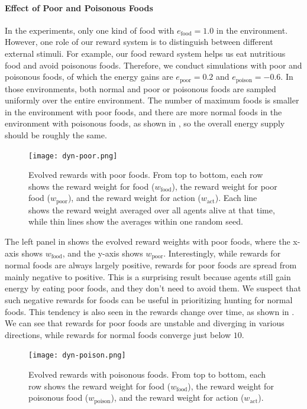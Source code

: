 \paragraph{Effect of Poor and Poisonous Foods}
In the experiments, only one kind of food with $e_{\mathrm{food}} = 1.0$ in the environment. However, one role of our reward system is to distinguish between different external stimuli. For example, our food reward system helps us eat nutritious food and avoid poisonous foods. Therefore, we conduct simulations with poor and poisonous foods, of which the energy gains are $e_{\mathrm{poor}} = 0.2$ and $e_{\mathrm{poison}} = -0.6$. In those environments, both normal and poor or poisonous foods are sampled uniformly over the entire environment. The number of maximum foods is smaller in the environment with poor foods, and there are more normal foods in the environment with poisonous foods, as shown in , so the overall energy supply should be roughly the same.

\begin{figure}[t]
  \centering
  \texttt{[image: dyn-poor.png]}
  \caption{
    Evolved rewards with poor foods.
    From top to bottom, each row shows the reward weight for food ($w_{\mathrm{food}}$), the reward weight for poor food ($w_{\mathrm{poor}}$), and the reward weight for action ($w_{\mathrm{act}}$).
    Each line shows the reward weight averaged over all agents alive at that time, while thin lines show the averages within one random seed.
  }\label{figure:result-dyn-poor}
\end{figure}

The left panel in  shows the evolved reward weights with poor foods, where the x-axis shows $w_{\mathrm{food}}$, and the y-axis shows $w_{\mathrm{poor}}$. Interestingly, while rewards for normal foods are always largely positive, rewards for poor foods are spread from mainly negative to positive. This is a surprising result because agents still gain energy by eating poor foods, and they don't need to avoid them. We suspect that such negative rewards for foods can be useful in prioritizing hunting for normal foods. This tendency is also seen in the rewards change over time, as shown in . We can see that rewards for poor foods are unstable and diverging in various directions, while rewards for normal foods converge just below $10$.

\begin{figure}[t]
  \centering
  \texttt{[image: dyn-poison.png]}
  \caption{
    Evolved rewards with poisonous foods.
    From top to bottom, each row shows the reward weight for food ($w_{\mathrm{food}}$), the reward weight for poisonous food ($w_{\mathrm{poison}}$), and the reward weight for action ($w_{\mathrm{act}}$).
  }\label{figure:result-dyn-poison}
\end{figure}

